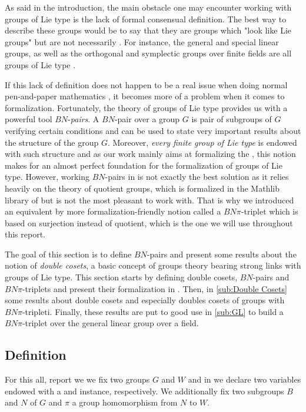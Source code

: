 As said in the introduction, the main obstacle one may encounter working  with groups of Lie type is the lack of formal consensual definition. The best way to describe these groups would be to say that they are groups which "look like Lie groups" but are not necessarily  . For instance, the general and special linear groups, as well as the orthogonal and symplectic groups over finite fields are all groups of Lie type .  


If this lack of definition does not happen to be a real issue when doing normal pen-and-paper mathematics , it becomes more of a problem when it comes to formalization. Fortunately, the theory of groups of Lie type provides us with a powerful tool $BN$-\emph{pairs}. A $BN$-pair over a group $G$ is pair of subgroups of $G$ verifying certain conditions and can be used to state very important results about the structure of the group $G$. Moreover, \emph{every finite group of Lie type} is endowed with such structure and as our work mainly aims at formalizing the \CFSG, this notion makes for an almost perfect foundation for the formalization of groups of Lie type. 
    However, working $BN$-pairs in \Lean is not exactly the best solution as it relies heavily on the theory of quotient groups, which is formalized in the Mathlib library of \Lean but is not the most pleasant to work with.  That is why we introduced an equivalent by more formalization-friendly notion called a $BN\pi$-triplet which is based on surjection instead of quotient, which is the one we will use throughout this report.

The goal of this section is to define $BN$-pairs and present some results about the notion of \emph{double cosets}, a basic concept of groups theory bearing strong links with groups of Lie type. This section starts by defining double cosets, $BN$-pairs and $BN\pi$-triplets and present their formalization in . Then, in \ref{sub:Double Cosets} some results about double cosets and especially doubles cosets of groups with $BN\pi$-tripleti. Finally, these results are put to good use in \ref{sub:GL} to build a $BN\pi$-triplet over the general linear group over a field.

\subsection{Definition}%

\label{sub:Definition}

For this all, report we we fix two groups $G$ and $W$ and in \Lean we declare two variables  endowed with a \lean{[Group G]} and \lean{[Group W]} instance, respectively. We additionally fix two subgroups $B$ and $N$ of $G$ and $\pi$ a group homomorphism from $N$ to $W$.

